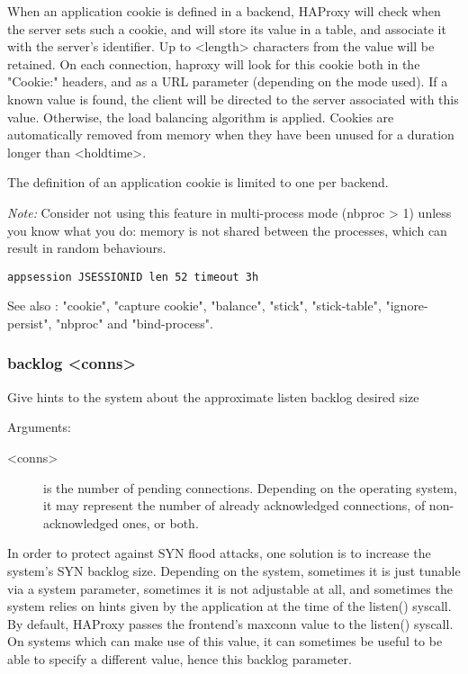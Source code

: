   When an application cookie is defined in a backend, HAProxy will check when
  the server sets such a cookie, and will store its value in a table, and
  associate it with the server's identifier. Up to <length> characters from
  the value will be retained. On each connection, haproxy will look for this
  cookie both in the "Cookie:" headers, and as a URL parameter (depending on
  the mode used). If a known value is found, the client will be directed to the
  server associated with this value. Otherwise, the load balancing algorithm is
  applied. Cookies are automatically removed from memory when they have been
  unused for a duration longer than <holdtime>.

  The definition of an application cookie is limited to one per backend.

  \emph{Note:}
         Consider not using this feature in multi-process mode (nbproc > 1)
         unless you know what you do: memory is not shared between the
         processes, which can result in random behaviours.
         
  \verb|appsession JSESSIONID len 52 timeout 3h|

  See also : "cookie", "capture cookie", "balance", "stick", "stick-table",
             "ignore-persist", "nbproc" and "bind-process".

\subsubsection[backlog]{backlog <conns>}
  Give hints to the system about the approximate listen backlog desired size
 
  
  Arguments:
  \begin{description}
  \item[<conns>]
         is the number of pending connections. Depending on the operating
              system, it may represent the number of already acknowledged
              connections, of non-acknowledged ones, or both.
  \end{description}

  In order to protect against SYN flood attacks, one solution is to increase
  the system's SYN backlog size. Depending on the system, sometimes it is just
  tunable via a system parameter, sometimes it is not adjustable at all, and
  sometimes the system relies on hints given by the application at the time of
  the listen() syscall. By default, HAProxy passes the frontend's maxconn value
  to the listen() syscall. On systems which can make use of this value, it can
  sometimes be useful to be able to specify a different value, hence this
  backlog parameter.

